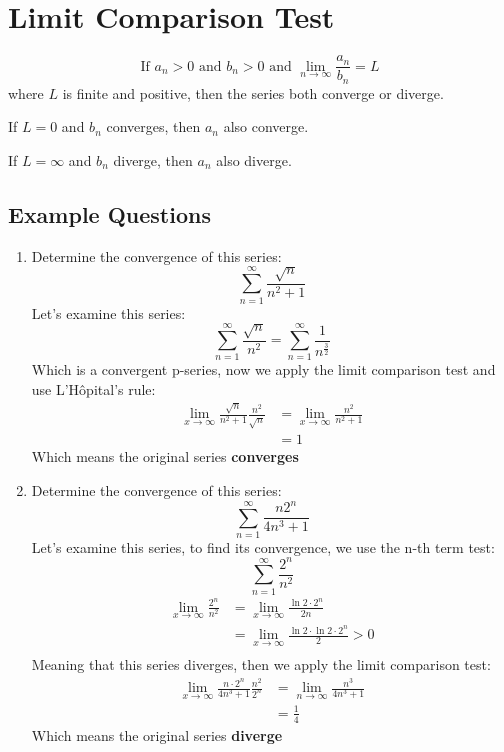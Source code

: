 \documentclass{article}
\numberwithin{equation}{section}
\begin{document}
\section{Limit Comparison Test}

\[
    \text{If } a_n > 0 \text{ and } b_n > 0 \text{ and } \lim_{n\to \infty} \frac{a_n}{b_n} = L 
\]
where $L$ is finite and positive, then the series both converge or diverge. 

If $L=0$ and $b_n$ converges, then $a_n$ also converge.

If $L=\infty$ and $b_n$ diverge, then $a_n$ also diverge.

\subsection{Example Questions}
\begin{enumerate}
    \item Determine the convergence of this series:
    \[
        \sum_{n = 1}^{\infty} \frac{\sqrt{n}}{n^2 + 1}
    \]
    Let's examine this series:
    \[
        \sum_{n = 1}^{\infty} \frac{\sqrt{n}}{n^2} = \sum_{n = 1}^{\infty} \frac{1}{n^{\frac{3}{2}}}
    \]
    Which is a convergent p-series, now we apply the limit comparison test and use L'Hôpital's rule:
    \[
        \begin{split}
            \lim_{x\to \infty} \frac{\sqrt{n}}{n^2 + 1} \frac{n^2}{\sqrt{n}} & = \lim_{x\to \infty} \frac{n^2}{n^2 + 1}\\
            & = 1
        \end{split}
    \]
    Which means the original series \textbf{converges}

    \item Determine the convergence of this series:
    \[
        \sum_{n = 1}^{\infty} \frac{n2^n}{4n^3 + 1}
    \]
    Let's examine this series, to find its convergence, we use the n-th term test:
    \[
        \sum_{n = 1}^{\infty} \frac{2^n}{n^2}
    \]
    \[
    \begin{split}
        \lim_{x\to \infty} \frac{2^n}{n^2} & = \lim_{x\to \infty} \frac{\ln 2\cdot 2^n}{2n}\\
        & = \lim_{x\to \infty} \frac{\ln 2 \cdot \ln 2 \cdot 2^n}{2} > 0\\
    \end{split}
    \]
    Meaning that this series diverges, then we apply the limit comparison test:
    \[
        \begin{split}
            \lim_{x\to \infty} \frac{n\cdot 2^n}{4n^3 + 1} \frac{n^2}{2^n} & = \lim_{n\to \infty} \frac{n^3}{4n^3 + 1}\\
            & = \frac{1}{4}
        \end{split}
    \]
    Which means the original series \textbf{diverge}
\end{enumerate}
\end{document}
